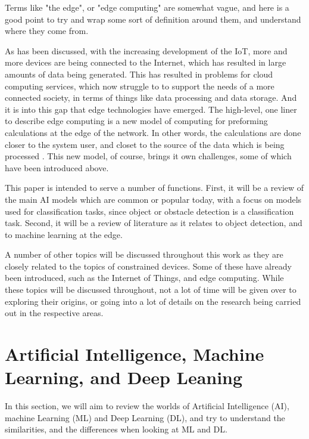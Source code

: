 \documentclass[conference]{IEEEtran}
\begin{document}
Terms like "the edge", or "edge computing" are somewhat vague, and here is a good point to try and wrap some sort of definition around them, and understand where they come from. 

As has been discussed, with the increasing development of the IoT, more and more devices are being connected to the Internet, which has resulted in large amounts of data being generated. This has resulted in problems for cloud computing services, which now struggle to to support the needs of a more connected society, in terms of things like data processing and data storage. And it is into this gap that edge technologies have emerged. The high-level, one liner to describe edge computing is a new model of computing for preforming calculations at the edge of the network. In other words, the calculations are done closer to the system user, and closet to the source of the data which is being processed \cite{Cao2020}. This new model, of course, brings it own challenges, some of which have been introduced above. 

This paper is intended to serve a number of functions. First, it will be a review of the main AI models which are common or popular today, with a focus on models used for classification tasks, since object or obstacle detection is a classification task. Second, it will be a review of literature as it relates to object detection, and to machine learning at the edge.

A number of other topics will be discussed throughout this work as they are closely related to the topics of constrained devices. Some of these have already been introduced, such as the Internet of Things, and edge computing. While these topics will be discussed throughout, not a lot of time will be given over to exploring their origins, or going into a lot of details on the research being carried out in the respective areas. 

\section{Artificial Intelligence, Machine Learning, and Deep Leaning}
In this section, we will aim to review the worlds of Artificial Intelligence (AI), machine Learning (ML) and Deep Learning (DL), and try to understand the similarities, and the differences when looking at ML and DL.
\end{document}
